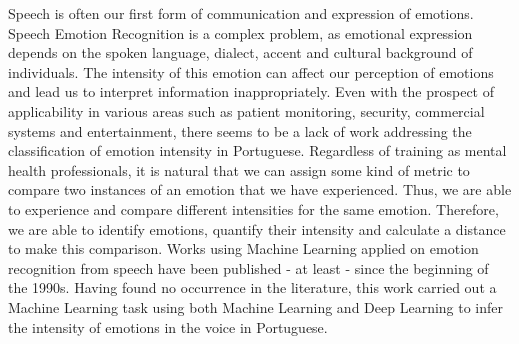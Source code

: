 Speech is often our first form of communication and expression of emotions. Speech Emotion Recognition is a complex problem, as emotional expression depends on the spoken language, dialect, accent and cultural background of individuals. The intensity of this emotion can affect our perception of emotions and lead us to interpret information inappropriately. Even with the prospect of applicability in various areas such as patient monitoring, security, commercial systems and entertainment, there seems to be a lack of work addressing the classification of emotion intensity in Portuguese. Regardless of training as mental health professionals, it is natural that we can assign some kind of metric to compare two instances of an emotion that we have experienced. Thus, we are able to experience and compare different intensities for the same emotion. Therefore, we are able to identify emotions, quantify their intensity and calculate a distance to make this comparison. Works using Machine Learning applied on emotion recognition from speech have been published - at least - since the beginning of the 1990s. Having found no occurrence in the literature, this work carried out a Machine Learning task using both Machine Learning and Deep Learning to infer the intensity of emotions in the voice in Portuguese.